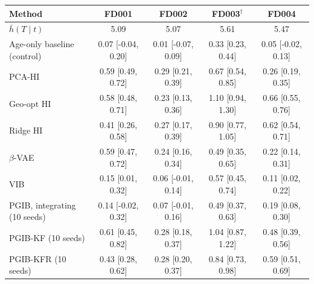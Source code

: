 \begin{tabular}{l c c c c }
\hline
Method & FD001 & FD002 & FD003$^\dagger$ & FD004 \\
\hline
$\bar h(T\mid t)$ & 5.09 & 5.07 & 5.61 & 5.47 \\
\hline
Age-only baseline (control) & 0.07 [-0.04, 0.20] & 0.01 [-0.07, 0.09] & 0.33 [0.23, 0.44] & 0.05 [-0.02, 0.13] \\
PCA-HI & 0.59 [0.49, 0.72] & 0.29 [0.21, 0.39] & 0.67 [0.54, 0.85] & 0.26 [0.19, 0.35] \\
Geo-opt HI & 0.58 [0.48, 0.71] & 0.23 [0.13, 0.36] & 1.10 [0.94, 1.30] & 0.66 [0.55, 0.76] \\
Ridge HI & 0.41 [0.26, 0.58] & 0.27 [0.17, 0.39] & 0.90 [0.77, 1.05] & 0.62 [0.54, 0.71] \\
$\beta$-VAE & 0.59 [0.47, 0.72] & 0.24 [0.16, 0.34] & 0.49 [0.35, 0.65] & 0.22 [0.14, 0.31] \\
VIB & 0.15 [0.01, 0.32] & 0.06 [-0.01, 0.14] & 0.57 [0.45, 0.74] & 0.11 [0.02, 0.22] \\
PGIB, integrating (10 seeds) & 0.14 [-0.02, 0.32] & 0.07 [-0.01, 0.16] & 0.49 [0.37, 0.63] & 0.19 [0.08, 0.30] \\
PGIB-KF (10 seeds) & 0.61 [0.45, 0.82] & 0.28 [0.18, 0.37] & 1.04 [0.87, 1.22] & 0.48 [0.39, 0.56] \\
PGIB-KFR (10 seeds) & 0.43 [0.28, 0.62] & 0.28 [0.20, 0.37] & 0.84 [0.73, 0.98] & 0.59 [0.51, 0.69] \\
\hline
\end{tabular}
